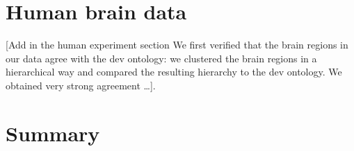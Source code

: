 \documentclass{article} %
\begin{document}
\label{Synthetic_exp}


\section{Human brain data}
\label{Human_exp}





[Add in the human experiment section We first verified that the brain regions in our data agree with the dev ontology: we clustered the brain regions in a hierarchical way and compared the resulting hierarchy to the dev ontology. We obtained very strong agreement …]. 


\section{Summary}





\end{document}
